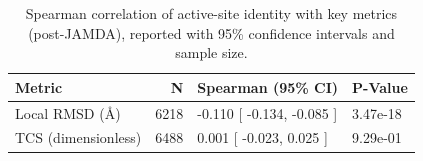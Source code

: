 \begin{table}[ht]
    \centering
    \begin{tabular}{lrll}
        \toprule
        Metric                      & N    & Spearman (95\% CI)        & P-Value  \\
        \midrule
        Local RMSD (\si{\angstrom}) & 6218 & -0.110 [ -0.134, -0.085 ] & 3.47e-18 \\
        TCS (dimensionless)         & 6488 & 0.001 [ -0.023, 0.025 ]   & 9.29e-01 \\
        \bottomrule
    \end{tabular}
    \caption[Active-site identity correlations]{Spearman correlation of active-site identity with key metrics (post-JAMDA), reported with 95\% confidence intervals and sample size.}
    \label{tab:identity-spearman}
\end{table}
